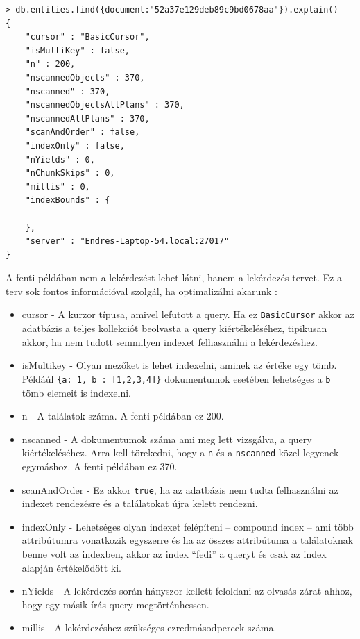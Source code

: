 \begin{lstlisting}[caption=Az diagram kollekció egy lekérdezésének a query terve]
> db.entities.find({document:"52a37e129deb89c9bd0678aa"}).explain()
{
    "cursor" : "BasicCursor",
    "isMultiKey" : false,
    "n" : 200,
    "nscannedObjects" : 370,
    "nscanned" : 370,
    "nscannedObjectsAllPlans" : 370,
    "nscannedAllPlans" : 370,
    "scanAndOrder" : false,
    "indexOnly" : false,
    "nYields" : 0,
    "nChunkSkips" : 0,
    "millis" : 0,
    "indexBounds" : {

    },
    "server" : "Endres-Laptop-54.local:27017"
}
\end{lstlisting}


A fenti példában nem a lekérdezést lehet látni, hanem a lekérdezés tervet. Ez a terv sok fontos információval szolgál, ha optimalizálni akarunk \cite{mongoexplain}:



\begin{itemize}
                        
  \item{cursor} - A kurzor típusa, amivel lefutott a query. Ha ez \lstinline{BasicCursor} akkor az adatbázis a teljes kollekciót beolvasta a query kiértékeléséhez, tipikusan akkor, ha nem tudott semmilyen indexet felhasználni a lekérdezéshez.
  \item{isMultikey} -  Olyan mezőket is lehet indexelni, aminek az értéke egy tömb. Példáúl \lstinline|{a: 1, b : [1,2,3,4]}| dokumentumok esetében lehetséges a \lstinline{b} tömb elemeit is indexelni. 
  \item{n} - A találatok száma. A fenti példában ez 200.
  \item{nscanned} - A dokumentumok száma ami meg lett vizsgálva, a query kiértékeléséhez. Arra kell törekedni, hogy a \lstinline{n} és a \lstinline{nscanned} közel legyenek egymáshoz. A fenti példában ez 370.

   \item{scanAndOrder} - Ez akkor \lstinline{true}, ha az adatbázis nem tudta felhasználni az indexet rendezésre és a találatokat újra kelett rendezni.
   \item{indexOnly} - Lehetséges olyan indexet felépíteni -- compound index -- ami több attribútumra vonatkozik egyszerre és ha az összes attribútuma a találatoknak benne volt az indexben, akkor az index ``fedi'' a queryt és csak az index alapján értékelődött ki. 
   \item{nYields} - A lekérdezés során hányszor kellett feloldani az olvasás zárat ahhoz, hogy egy másik írás query megtörténhessen. 
   \item{millis} - A lekérdezéshez szükséges ezredmásodpercek száma.


\end{itemize}

